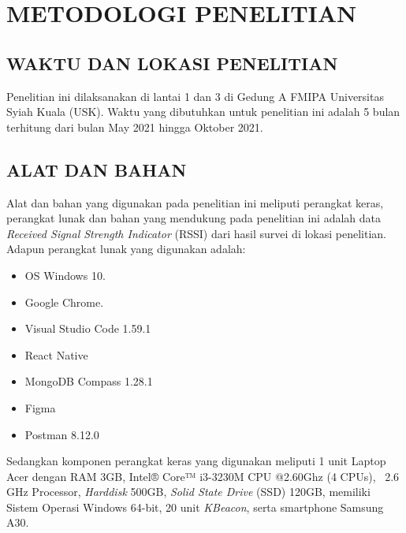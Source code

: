 \fancyhf{}
\fancyfoot[C]{\thepage}
\chapter{METODOLOGI PENELITIAN}

\section{\uppercase{WAKTU DAN LOKASI PENELITIAN}}
\setlength\parindent{30pt} Penelitian ini dilaksanakan di lantai 1 dan 3 di Gedung A FMIPA Universitas Syiah Kuala (USK). Waktu yang dibutuhkan untuk penelitian ini adalah 5 bulan terhitung dari bulan May 2021 hingga Oktober 2021.

\section{\uppercase{ALAT DAN BAHAN}}
Alat dan bahan yang digunakan pada penelitian ini meliputi perangkat keras, perangkat lunak dan bahan yang mendukung pada penelitian ini adalah data \textit{Received Signal Strength Indicator} (RSSI) dari hasil survei di lokasi penelitian. Adapun perangkat lunak yang digunakan adalah:
\begin{itemize}
	\itemsep0em
	\item OS Windows 10.
	\item Google Chrome.
	\item Visual Studio Code 1.59.1
	\item React Native
	\item MongoDB Compass 1.28.1
	\item Figma
	\item Postman 8.12.0
\end{itemize}

\par Sedangkan komponen perangkat keras yang digunakan meliputi 1 unit Laptop Acer dengan RAM 3GB, Intel® Core™ i3-3230M CPU @2.60Ghz (4 CPUs), ~2.6 GHz Processor, \textit{Harddisk} 500GB, \textit{Solid State Drive} (SSD) 120GB, memiliki Sistem Operasi Windows 64-bit, 20 unit \textit{KBeacon}, serta smartphone Samsung A30.

